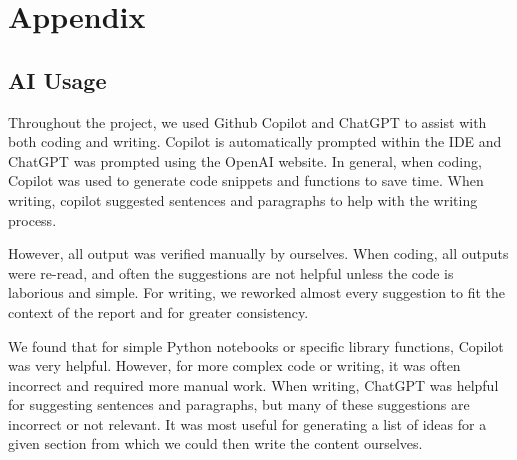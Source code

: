 \appendix

\onecolumn
\clearpage

\section{Appendix}
\label{sec:appendix}


\subsection{AI Usage}

Throughout the project, we used Github Copilot and ChatGPT to assist with both
coding and writing.  Copilot is automatically prompted within the IDE and
ChatGPT was prompted using the OpenAI website.  In general, when coding, Copilot
was used to generate code snippets and functions to save time.  When writing,
copilot suggested sentences and paragraphs to help with the writing process. 

However, all output was verified manually by ourselves. When coding, all outputs
were re-read, and often the suggestions are not helpful unless the code is
laborious and simple.  For writing, we reworked almost every suggestion to fit
the context of the report and for greater consistency. 

We found that for simple Python notebooks or specific library functions, Copilot
was very helpful.  However, for more complex code or writing, it was often
incorrect and required more manual work.  When writing, ChatGPT was helpful for
suggesting sentences and paragraphs, but many of these suggestions are incorrect
or not relevant.  It was most useful for generating a list of ideas for a given
section from which we could then write the content ourselves.

